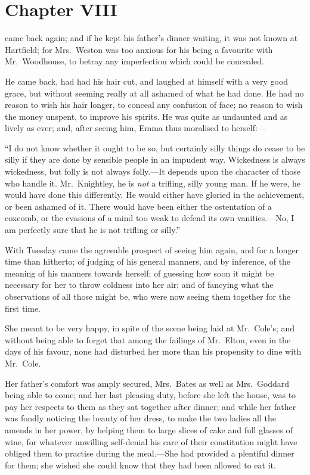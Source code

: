 \chapter{Chapter VIII}


 came back again; and if he kept his father's
dinner waiting, it was not known at Hartfield; for Mrs.\ Weston
was too anxious for his being a favourite with Mr.\ Woodhouse,
to betray any imperfection which could be concealed.

He came back, had had his hair cut, and laughed at himself with
a very good grace, but without seeming really at all ashamed
of what he had done.  He had no reason to wish his hair longer,
to conceal any confusion of face; no reason to wish the money unspent,
to improve his spirits.  He was quite as undaunted and as lively
as ever; and, after seeing him, Emma thus moralised to herself:---%

``I do not know whether it ought to be so, but certainly silly things
do cease to be silly if they are done by sensible people in an
impudent way.  Wickedness is always wickedness, but folly is not
always folly.---It depends upon the character of those who handle it.
Mr.\ Knightley, he is \emph{not} a trifling, silly young man.  If he were,
he would have done this differently.  He would either have gloried
in the achievement, or been ashamed of it.  There would have been
either the ostentation of a coxcomb, or the evasions of a mind too
weak to defend its own vanities.---No, I am perfectly sure that he
is not trifling or silly.''

With Tuesday came the agreeable prospect of seeing him again,
and for a longer time than hitherto; of judging of his general manners,
and by inference, of the meaning of his manners towards herself;
of guessing how soon it might be necessary for her to throw coldness
into her air; and of fancying what the observations of all those
might be, who were now seeing them together for the first time.

She meant to be very happy, in spite of the scene being laid at
Mr.\ Cole's; and without being able to forget that among the failings
of Mr.\ Elton, even in the days of his favour, none had disturbed
her more than his propensity to dine with Mr.\ Cole.

Her father's comfort was amply secured, Mrs.\ Bates as well as
Mrs.\ Goddard being able to come; and her last pleasing duty,
before she left the house, was to pay her respects to them as
they sat together after dinner; and while her father was fondly
noticing the beauty of her dress, to make the two ladies all
the amends in her power, by helping them to large slices of cake
and full glasses of wine, for whatever unwilling self-denial his
care of their constitution might have obliged them to practise
during the meal.---She had provided a plentiful dinner for them;
she wished she could know that they had been allowed to eat it.

